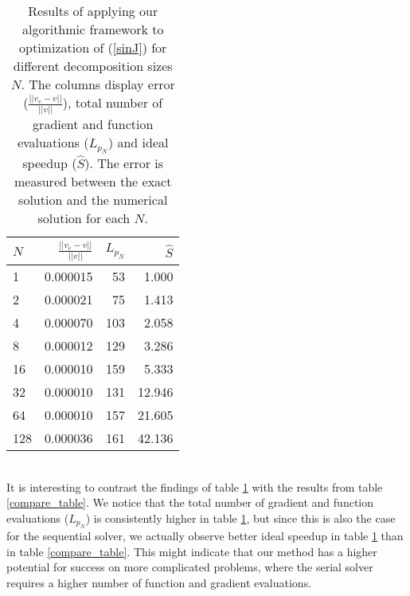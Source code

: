 \begin{table}
\caption{Results of applying our algorithmic framework to optimization of (\ref{sinJ}) for different decomposition sizes $N$. The columns display error ($\frac{||v_e-v||}{||v||}$), total number of gradient and function evaluations ($L_{p_N}$) and ideal speedup ($\hat S$). The error is measured between the exact solution and the numerical solution for each $N$.}
\centering
\label{unsmoothTab}
\begin{tabular}{lrrr}
\toprule
{} $N$&   $\frac{||v_e-v||}{||v||}$ &  $L_{p_N}$ &     $\hat S$ \\
\midrule
1   &  0.000015 &   53 &   1.000 \\
2   &  0.000021 &   75 &   1.413 \\
4   &  0.000070 &  103 &   2.058 \\
8   &  0.000012 &  129 &   3.286 \\
16  &  0.000010 &  159 &   5.333 \\
32  &  0.000010 &  131 &  12.946 \\
64  &  0.000010 &  157 &  21.605 \\
128 &  0.000036 &  161 &  42.136 \\
\bottomrule
\end{tabular}
\end{table}
\\
It is interesting to contrast the findings of table \ref{unsmoothTab} with the results from table \ref{compare_table}. We notice that the total number of gradient and function evaluations ($L_{p_N}$) is consistently higher in table \ref{unsmoothTab}, but since this is also the case for the sequential solver, we actually observe better ideal speedup in table \ref{unsmoothTab} than in table \ref{compare_table}. This might indicate that our method has a higher potential for success on more complicated problems, where the serial solver requires a higher number of function and gradient evaluations.